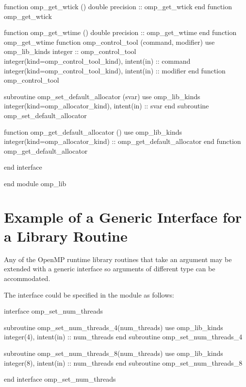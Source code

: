 {\begin{ompfFunction}
          function omp_get_wtick ()
           double precision :: omp_get_wtick
          end function omp_get_wtick

          function omp_get_wtime ()
           double precision :: omp_get_wtime
          end function omp_get_wtime
          function omp_control_tool (command, modifier)
           use omp_lib_kinds
           integer :: omp_control_tool
           integer(kind=omp_control_tool_kind), intent(in) :: command
           integer(kind=omp_control_tool_kind), intent(in) :: modifier
          end function omp_control_tool

          subroutine omp_set_default_allocator (svar)
           use omp_lib_kinds
           integer(kind=omp_allocator_kind), intent(in) :: svar
          end subroutine omp_set_default_allocator

          function omp_get_default_allocator ()
           use omp_lib_kinds
           integer(kind=omp_allocator_kind) :: omp_get_default_allocator
          end function omp_get_default_allocator

          end interface

        end module omp_lib
\end{ompfFunction}} %






\pagebreak
\section{Example of a Generic Interface for a Library Routine}
\label{sec:Example of a Generic Interface for a Library Routine}
Any of the OpenMP runtime library routines that take an argument may be extended 
with a generic interface so arguments of different  type can be accommodated.

The  interface could be specified in the  module 
as follows:

\begin{ompfSubroutine}
interface omp_set_num_threads

    subroutine omp_set_num_threads_4(num_threads)
      use omp_lib_kinds
      integer(4), intent(in) :: num_threads
    end subroutine omp_set_num_threads_4

    subroutine omp_set_num_threads_8(num_threads)
      use omp_lib_kinds
      integer(8), intent(in) :: num_threads
    end subroutine omp_set_num_threads_8

end interface omp_set_num_threads
\end{ompfSubroutine}


